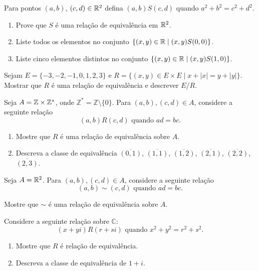 \documentclass[12pt]{exam}
\begin{document}
\vspace{.3cm}

\questao Para pontos $(a, b)$, $(c, d) \in \mathbb{R}^2$ defina $(a, b) S (c, d)$ quando $a^2 + b^2 = c^2 + d^2$.
\begin{enumerate}[label={\alph*})]
  \item Prove que $S$ \'e uma rela\c{c}\~ao de equival\^encia em $\mathbb{R}^2$.
  \item Liste todos os elementos no conjunto $\{(x, y) \in \mathbb{R} \mid (x, y) S (0, 0)\}$.
  \item Liste cinco elementos distintos no conjunto $\{(x, y) \in \mathbb{R} \mid (x, y) S (1, 0)\}$.
\end{enumerate}

\vspace{.3cm}

\questao Sejam $E = \{-3, -2, -1, 0, 1, 2, 3\}$ e $R = \{(x, y) \in E \times E \mid x + |x| = y + |y|\}$. Mostrar que $R$ \'e uma rela\c{c}\~ao de equival\^encia e descrever $E/R$.

\vspace{.3cm}

\questao Seja $A=\mathbb{Z}\times \mathbb{Z}^*$, onde
$\mathbb{Z}^*=\mathbb{Z}\setminus \{0\}$. Para $(a,b), (c,d) \in
A$, considere a seguinte rela{\c c}{\~a}o
\[
(a,b)R (c,d) \mbox{ quando } ad=bc.
\]
\begin{enumerate}[label={\alph*})]
\item Mostre que $R$ {\'e} uma rela{\c c}{\~a}o de equival{\^e}ncia sobre $A$.
\item Descreva a classe de equival{\^e}ncia $\overline{(0,1)}$, $\overline{(1,1)}$, $\overline{(1,2)}$, $\overline{(2,1)}$, $\overline{(2,2)}$, $\overline{(2,3)}$.
\end{enumerate}

\vspace{.3cm}

\questao Seja $A = \mathbb{R}^2$. Para $(a,b), (c,d) \in A$, considere a seguinte rela{\c c}{\~a}o
\[
    (a,b) \sim (c,d) \mbox{ quando } ad = bc.
\]

Mostre que $\sim$ {\'e} uma rela{\c c}{\~a}o de equival{\^e}ncia sobre $A$.

\vspace{.3cm}

\questao Considere a seguinte rela{\c c}{\~a}o sobre $\mathbb{C}$:
\[
(x+yi)R(r+si) \mbox{ quando } x^2+y^2=r^2+s^2.
\]
\begin{enumerate}[label={\alph*})]
\item Mostre que $R$ {\'e} rela{\c c}{\~a}o de equival{\^e}ncia.
\item Descreva a classe de equival{\^e}ncia de $1+i$.
\end{enumerate}
\end{document}
